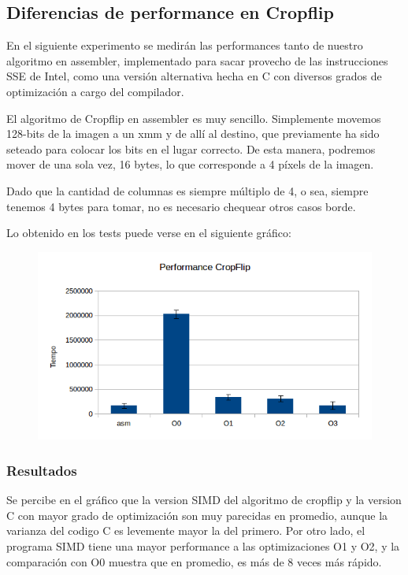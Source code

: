 \documentclass[a4paper]{article}
\begin{document}
\subsection{Diferencias de performance en Cropflip}
En el siguiente experimento se medirán las performances tanto de nuestro algoritmo en assembler, implementado para sacar provecho de las instrucciones SSE de Intel, como una versión alternativa hecha en C con diversos grados de optimización a cargo del compilador.

El algoritmo de Cropflip en assembler es muy sencillo. Simplemente movemos 128-bits de la imagen a un xmm y de allí al destino, que previamente ha sido seteado para colocar los bits en el lugar correcto. De esta manera, podremos mover de una sola vez, 16 bytes, lo que corresponde a 4 píxels de la imagen.

Dado que la cantidad de columnas es siempre múltiplo de 4, o sea, siempre tenemos 4 bytes para tomar, no es necesario chequear otros casos borde.

Lo obtenido en los tests puede verse en el siguiente gráfico:

\begin{figure}[h!]
  \begin{center}
	\includegraphics[scale=0.66]{Graficos1.4/crop/per.jpg}
	\label{nombreparareferenciar5}
  \end{center}
\end{figure}

\subsubsection{Resultados}

Se percibe en el gráfico que la version SIMD del algoritmo de cropflip  y la version C con mayor grado de optimización son muy parecidas en promedio, aunque la varianza del codigo C es levemente mayor la del primero. Por otro lado, el programa SIMD tiene una mayor performance a las optimizaciones O1 y O2, y la comparación con O0 muestra que en promedio, es más de 8 veces más rápido.
\end{document}
